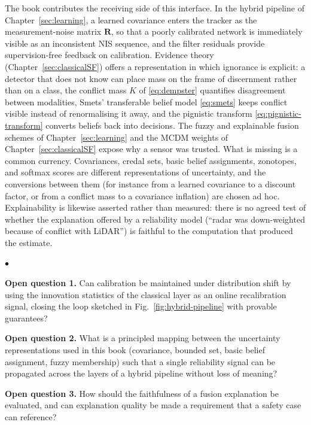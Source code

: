 \documentclass[graybox,envcountchap]{style/SNmono}
\newenvironment{list4a}{
  \begin{list}{$\bullet$}{
      \setlength{\itemsep}{0.05cm}
      \setlength{\labelsep}{0.2cm}
      \setlength{\labelwidth}{0.3cm}
      \setlength{\parsep}{0in}
      \setlength{\parskip}{0in}
      \setlength{\topsep}{0in}
      \setlength{\partopsep}{0in}
      \setlength{\leftmargin}{0.16in}}}
      {\end{list}}
\begin{document}
The book contributes the receiving side of this interface. In the hybrid pipeline of Chapter~\ref{sec:learning}, a learned covariance enters the tracker as the measurement-noise matrix $\mathbf{R}$, so that a poorly calibrated network is immediately visible as an inconsistent NIS sequence, and the filter residuals provide supervision-free feedback on calibration. Evidence theory (Chapter~\ref{sec:classicalSF}) offers a representation in which ignorance is explicit: a detector that does not know can place mass on the frame of discernment rather than on a class, the conflict mass $K$ of \eqref{eq:dempster} quantifies disagreement between modalities, Smets' transferable belief model \eqref{eq:smets} keeps conflict visible instead of renormalising it away, and the pignistic transform \eqref{eq:pignistic-transform} converts beliefs back into decisions. The fuzzy and explainable fusion schemes of Chapter~\ref{sec:learning} and the MCDM weights of Chapter~\ref{sec:classicalSF} expose why a sensor was trusted. What is missing is a common currency. Covariances, credal sets, basic belief assignments, zonotopes, and softmax scores are different representations of uncertainty, and the conversions between them (for instance from a learned covariance to a discount factor, or from a conflict mass to a covariance inflation) are chosen ad hoc. Explainability is likewise asserted rather than measured: there is no agreed test of whether the explanation offered by a reliability model (``radar was down-weighted because of conflict with LiDAR'') is faithful to the computation that produced the estimate.

\begin{list4a}
    \item \textbf{Open question 1.} Can calibration be maintained under distribution shift by using the innovation statistics of the classical layer as an online recalibration signal, closing the loop sketched in Fig.~\ref{fig:hybrid-pipeline} with provable guarantees?
    \item \textbf{Open question 2.} What is a principled mapping between the uncertainty representations used in this book (covariance, bounded set, basic belief assignment, fuzzy membership) such that a single reliability signal can be propagated across the layers of a hybrid pipeline without loss of meaning?
    \item \textbf{Open question 3.} How should the faithfulness of a fusion explanation be evaluated, and can explanation quality be made a requirement that a safety case can reference?
\end{list4a}
\end{document}
